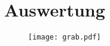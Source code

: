 \section{Auswertung}
\label{sec:Auswertung}


\begin{figure}[H]
	\centering
	\caption{}
	\texttt{[image: grab.pdf]}
	\label{fig:grab}
\end{figure}




